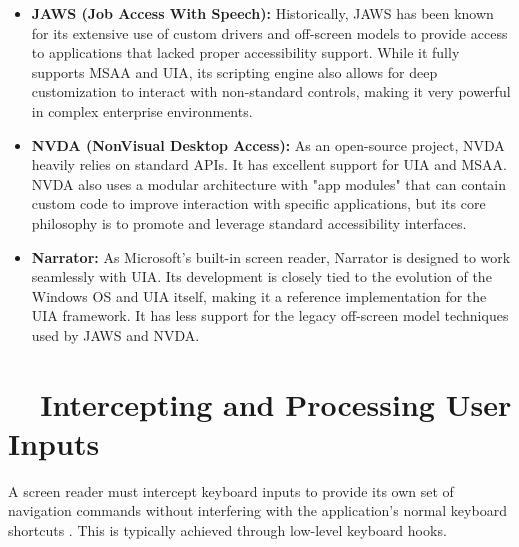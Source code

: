 \begin{itemize}
	\item \textbf{JAWS (Job Access With Speech):} Historically, JAWS has been known for its extensive use of custom drivers and off-screen models to provide access to applications that lacked proper accessibility support. While it fully supports MSAA and UIA, its scripting engine also allows for deep customization to interact with non-standard controls, making it very powerful in complex enterprise environments.
	\item \textbf{NVDA (NonVisual Desktop Access):} As an open-source project, NVDA heavily relies on standard APIs. It has excellent support for UIA and MSAA. NVDA also uses a modular architecture with "app modules" that can contain custom code to improve interaction with specific applications, but its core philosophy is to promote and leverage standard accessibility interfaces.
	\item \textbf{Narrator:} As Microsoft's built-in screen reader, Narrator is designed to work seamlessly with UIA. Its development is closely tied to the evolution of the Windows OS and UIA itself, making it a reference implementation for the UIA framework. It has less support for the legacy off-screen model techniques used by JAWS and NVDA.
\end{itemize}

\section{~~Intercepting and Processing User Inputs}
\label{sec:intercepting-and-processing-user-inputs}

A screen reader must intercept keyboard inputs to provide its own set of navigation commands without interfering with the application's normal keyboard shortcuts \cite{WSRKeystrokeCompendium}. This is typically achieved through low-level keyboard hooks.

